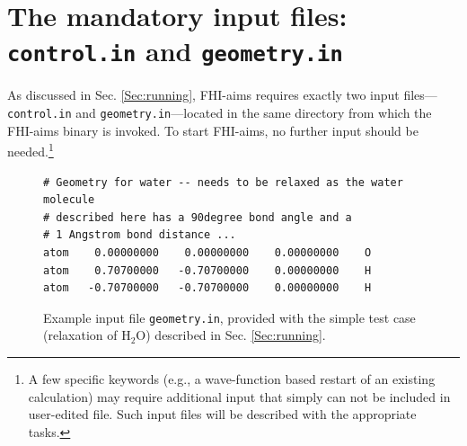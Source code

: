 \section{The mandatory input files: \texttt{control.in} and \texttt{geometry.in}}

As discussed in Sec. \ref{Sec:running}, FHI-aims requires exactly two input
files---\texttt{control.in} and \texttt{geometry.in}---located in
the same directory from which the FHI-aims binary is invoked. To start
FHI-aims, no further input should be needed.\footnote{A few specific keywords
  (e.g., a wave-function based restart of an existing calculation) may require
  additional input that simply can not be included in user-edited file. Such
  input files will be described with the appropriate tasks.}

\begin{figure}
  \small
  \begin{verbatim}
# Geometry for water -- needs to be relaxed as the water molecule 
# described here has a 90degree bond angle and a 
# 1 Angstrom bond distance ... 
atom    0.00000000    0.00000000    0.00000000    O
atom    0.70700000   -0.70700000    0.00000000    H 
atom   -0.70700000   -0.70700000    0.00000000    H 
  \end{verbatim}
  \normalsize
  \caption{\label{Fig:geometry.in}
    Example input file \texttt{geometry.in}, provided with the simple
    test case (relaxation of H$_2$O) described in Sec. \ref{Sec:running}.
  }
\end{figure}

